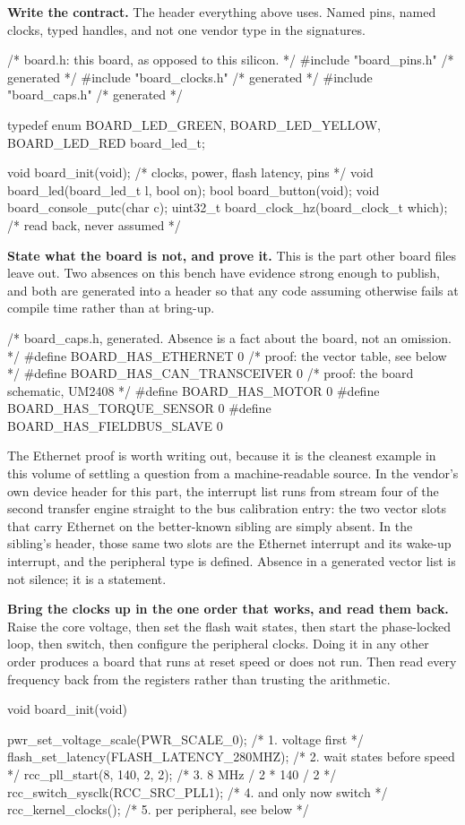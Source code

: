 \begin{steps}
\item \textbf{Write the contract.} The header everything above uses. Named pins,
named clocks, typed handles, and not one vendor type in the signatures.
\begin{ccode}
/* board.h: this board, as opposed to this silicon. */
#include "board_pins.h"     /* generated */
#include "board_clocks.h"   /* generated */
#include "board_caps.h"     /* generated */

typedef enum { BOARD_LED_GREEN, BOARD_LED_YELLOW, BOARD_LED_RED } board_led_t;

void     board_init(void);            /* clocks, power, flash latency, pins */
void     board_led(board_led_t l, bool on);
bool     board_button(void);
void     board_console_putc(char c);
uint32_t board_clock_hz(board_clock_t which);   /* read back, never assumed */
\end{ccode}

\item \textbf{State what the board is not, and prove it.} This is the part other
board files leave out. Two absences on this bench have evidence strong enough to
publish, and both are generated into a header so that any code assuming
otherwise fails at compile time rather than at bring-up.
\begin{ccode}
/* board_caps.h, generated. Absence is a fact about the board, not an omission. */
#define BOARD_HAS_ETHERNET       0   /* proof: the vector table, see below */
#define BOARD_HAS_CAN_TRANSCEIVER 0  /* proof: the board schematic, UM2408 */
#define BOARD_HAS_MOTOR          0
#define BOARD_HAS_TORQUE_SENSOR  0
#define BOARD_HAS_FIELDBUS_SLAVE 0
\end{ccode}
The Ethernet proof is worth writing out, because it is the cleanest example in
this volume of settling a question from a machine-readable source. In the
vendor's own device header for this part, the interrupt list runs from stream
four of the second transfer engine straight to the bus calibration entry: the
two vector slots that carry Ethernet on the better-known sibling are simply
absent. In the sibling's header, those same two slots are the Ethernet interrupt
and its wake-up interrupt, and the peripheral type is defined. Absence in a
generated vector list is not silence; it is a statement.

\item \textbf{Bring the clocks up in the one order that works, and read them
back.} Raise the core voltage, then set the flash wait states, then start the
phase-locked loop, then switch, then configure the peripheral clocks. Doing it
in any other order produces a board that runs at reset speed or does not run.
Then read every frequency back from the registers rather than trusting the
arithmetic.
\begin{ccode}
void board_init(void)
{
    pwr_set_voltage_scale(PWR_SCALE_0);       /* 1. voltage first          */
    flash_set_latency(FLASH_LATENCY_280MHZ);  /* 2. wait states before speed */
    rcc_pll_start(8, 140, 2, 2);              /* 3. 8 MHz / 2 * 140 / 2     */
    rcc_switch_sysclk(RCC_SRC_PLL1);          /* 4. and only now switch     */
    rcc_kernel_clocks();                      /* 5. per peripheral, see below */

}
\end{ccode}
\end{steps}
